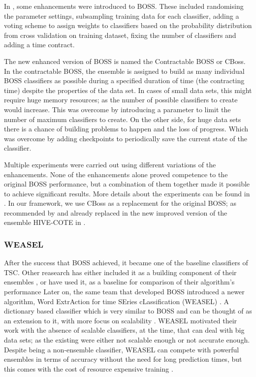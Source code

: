 In \cite{middlehurst2019scalable}, some enhancements were introduced to BOSS.
These included randomising the parameter settings, subsampling training data for each classifier,
adding a voting scheme to assign weights to classifiers based on the probability distribution from cross validation on training dataset,
fixing the number of classifiers and adding a time contract.

The new enhanced version of BOSS is named the Contractable BOSS or CBoss.
In the contractable BOSS, the ensemble is assigned to build as many individual BOSS classifiers as possible during a specified duration of time (the contracting time) despite the properties of the data set.
In cases of small data sets, this might require huge memory resources; as the number of possible classifiers to create would increase.
This was overcome by introducing a parameter to limit the number of maximum classifiers to create.
On the other side, for huge data sets there is a chance of building problems to happen and the loss of progress.
Which was overcome by adding checkpoints to periodically save the current state of the classifier.

Multiple experiments were carried out using different variations of the enhancements.
None of the enhancements alone proved competence to the original BOSS performance, but a combination of them together made it possible to achieve significant results.
More details about the experiments can be found in \cite{middlehurst2019scalable}.
In our framework, we use CBoss as a replacement for the original BOSS; as recommended by \cite{middlehurst2019scalable}
and already replaced in the new improved version of the ensemble HIVE-COTE in \cite{bagnall2020tale}.

\subsubsection{WEASEL}
\label{SubsubsectionWEASEL}
After the success that BOSS achieved, it became one of the baseline classifiers of TSC.
Other reasearch has either included it as a building component of their ensembles \cite{lines2018time, bagnall2015time},
or have used it, as a baseline for comparison of their algorithm's performance \cite{fawaz2020inceptiontime,shifaz2020ts,lucas2019proximity}
Later on, the same team that developed BOSS introduced a newer algorithm, Word ExtrAction for time SEries cLassification (WEASEL) \cite{schafer2017fast}.
A dictionary based classifier which is very similar to BOSS and can be thought of as an extension to it, with more focus on scalability \cite{middlehurst2019scalable}.
WEASEL motivated their work with the absence of scalable classifiers, at the time, that can deal with big data sets; as the existing were either not scalable enough
or not accurate enough. Despite being a non-ensemble classifier, WEASEL can compete with powerful ensembles in terms of accuracy without the need for
long prediction times, but this comes with the cost of resource expensive training \cite{middlehurst2019scalable}.

